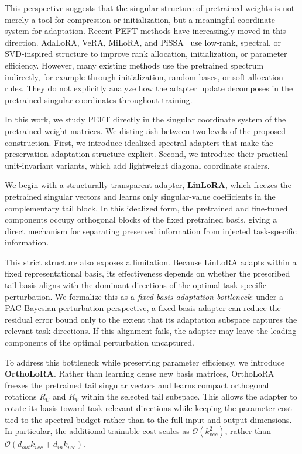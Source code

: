 \documentclass{article}
\begin{document}
This perspective suggests that the singular structure of pretrained weights is not merely a tool for compression or initialization, but a meaningful coordinate system for adaptation. Recent PEFT methods have increasingly moved in this direction. AdaLoRA, VeRA, MiLoRA, and PiSSA~\citep{zhang2023adalora, kopiczko2023vera, wang2025milora, meng2024pissa} use low-rank, spectral, or SVD-inspired structure to improve rank allocation, initialization, or parameter efficiency. However, many existing methods use the pretrained spectrum indirectly, for example through initialization, random bases, or soft allocation rules. They do not explicitly analyze how the adapter update decomposes in the pretrained singular coordinates throughout training.

In this work, we study PEFT directly in the singular coordinate system of the pretrained weight matrices. We distinguish between two levels of the proposed construction. First, we introduce idealized spectral adapters that make the preservation-adaptation structure explicit. Second, we introduce their practical unit-invariant variants, which add lightweight diagonal coordinate scalers.

We begin with a structurally transparent adapter, \textbf{LinLoRA}, which freezes the pretrained singular vectors and learns only singular-value coefficients in the complementary tail block. In this idealized form, the pretrained and fine-tuned components occupy orthogonal blocks of the fixed pretrained basis, giving a direct mechanism for separating preserved information from injected task-specific information.

This strict structure also exposes a limitation. Because LinLoRA adapts within a fixed representational basis, its effectiveness depends on whether the prescribed tail basis aligns with the dominant directions of the optimal task-specific perturbation. We formalize this as a \emph{fixed-basis adaptation bottleneck}: under a PAC-Bayesian perturbation perspective, a fixed-basis adapter can reduce the residual error bound only to the extent that its adaptation subspace captures the relevant task directions. If this alignment fails, the adapter may leave the leading components of the optimal perturbation uncaptured.

To address this bottleneck while preserving parameter efficiency, we introduce \textbf{OrthoLoRA}. Rather than learning dense new basis matrices, OrthoLoRA freezes the pretrained tail singular vectors and learns compact orthogonal rotations \(R_U\) and \(R_V\) within the selected tail subspace. This allows the adapter to rotate its basis toward task-relevant directions while keeping the parameter cost tied to the spectral budget rather than to the full input and output dimensions. In particular, the additional trainable cost scales as \(\mathcal{O}(k_{vec}^2)\), rather than \(\mathcal{O}(d_{out}k_{vec}+d_{in}k_{vec})\).
\end{document}
